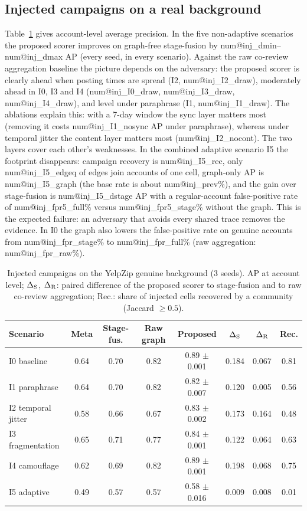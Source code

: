 \documentclass[pdflatex,sn-basic]{sn-jnl}
\makeatletter
\theoremstyle{thmstyleone}
\theoremstyle{thmstylethree}
\newcommand{\num}[1]{\csname num@#1\endcsname}
\makeatother
\begin{document}
\subsection{Injected campaigns on a real background}\label{sec:res_inject}
Table~\ref{tab:inject} gives account-level average precision. In the five non-adaptive scenarios the proposed scorer improves on graph-free stage-fusion by \num{inj_dmin}--\num{inj_dmax} AP (every seed, in every scenario). Against the raw co-review aggregation baseline the picture depends on the adversary: the proposed scorer is clearly ahead when posting times are spread (I2, \num{inj_I2_draw}), moderately ahead in I0, I3 and I4 (\num{inj_I0_draw}, \num{inj_I3_draw}, \num{inj_I4_draw}), and level under paraphrase (I1, \num{inj_I1_draw}). The ablations explain this: with a 7-day window the sync layer matters most (removing it costs \num{inj_I1_nosync} AP under paraphrase), whereas under temporal jitter the content layer matters most (\num{inj_I2_nocont}). The two layers cover each other's weaknesses. In the combined adaptive scenario I5 the footprint disappears: campaign recovery is \num{inj_I5_rec}, only \num{inj_I5_edgeq} of edges join accounts of one cell, graph-only AP is \num{inj_I5_graph} (the base rate is about \num{inj_prev}\%), and the gain over stage-fusion is \num{inj_I5_dstage} AP with a regular-account false-positive rate of \num{inj_fpr5_full}\% versus \num{inj_fpr5_stage}\% without the graph. This is the expected failure: an adversary that avoids every shared trace removes the evidence. In I0 the graph also lowers the false-positive rate on genuine accounts from \num{inj_fpr_stage}\% to \num{inj_fpr_full}\% (raw aggregation: \num{inj_fpr_raw}\%).

\begin{table}[t]
\caption{Injected campaigns on the YelpZip genuine background (3 seeds). AP at account level; $\Delta_{\rm S}$, $\Delta_{\rm R}$: paired difference of the proposed scorer to stage-fusion and to raw co-review aggregation; Rec.: share of injected cells recovered by a community (Jaccard $\ge0.5$).}\label{tab:inject}
\footnotesize\setlength{\tabcolsep}{2.5pt}
\begin{tabular}{@{}lccccccc@{}}
\toprule
Scenario & Meta & Stage-fus. & Raw graph & Proposed & $\Delta_{\rm S}$ & $\Delta_{\rm R}$ & Rec. \\
\midrule
I0 baseline & 0.64 & 0.70 & 0.82 & 0.89 $\pm$ 0.001 & 0.184 & 0.067 & 0.81 \\
I1 paraphrase & 0.64 & 0.70 & 0.82 & 0.82 $\pm$ 0.007 & 0.120 & 0.005 & 0.56 \\
I2 temporal jitter & 0.58 & 0.66 & 0.67 & 0.83 $\pm$ 0.002 & 0.173 & 0.164 & 0.48 \\
I3 fragmentation & 0.65 & 0.71 & 0.77 & 0.84 $\pm$ 0.001 & 0.122 & 0.064 & 0.63 \\
I4 camouflage & 0.62 & 0.69 & 0.82 & 0.89 $\pm$ 0.001 & 0.198 & 0.068 & 0.75 \\
I5 adaptive & 0.49 & 0.57 & 0.57 & 0.58 $\pm$ 0.016 & 0.009 & 0.008 & 0.01 \\
\bottomrule
\end{tabular}
\end{table}
\end{document}
